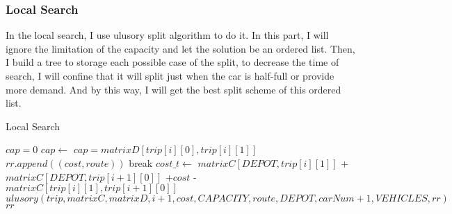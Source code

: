 \documentclass[conference,compsoc]{IEEEtran}
\begin{document}
    \subsubsection{Local Search}
      In the local search, I use ulusory split algorithm to do it. In this part, I will ignore the limitation of the capacity and let the solution be an ordered list.
      Then, I build a tree to storage each possible case of the split, to decrease the time of search, I will confine that it will split just when the car is half-full or provide more demand.
      And by this way, I will get the best split scheme of this ordered list.
      \begin{algorithm}
        \caption{Local Search}
        \begin{algorithmic}[1]
          \State $cap = 0$
            \State $cap \gets$ $cap = matrixD[trip[i][0],trip[i][1]]$
                \State $rr.append((cost,route))$
                break
              \EndIf
                \State $cost\_t \gets$ 
                $matrixC[DEPOT,trip[i][1]]$
                +$matrixC[DEPOT,trip[i+1][0]]$
                +$cost$
                -$matrixC[trip[i][1],trip[i+1][0]]$
                \State $ulusory(trip, matrixC, matrixD, i+1, cost, CAPACITY, route, DEPOT, carNum+1, VEHICLES, rr)$
                \EndIf
            \EndIf
          \EndFor
          \State\Return $rr$
          \EndFunction
        \end{algorithmic}
      \end{algorithm}
\end{document}
